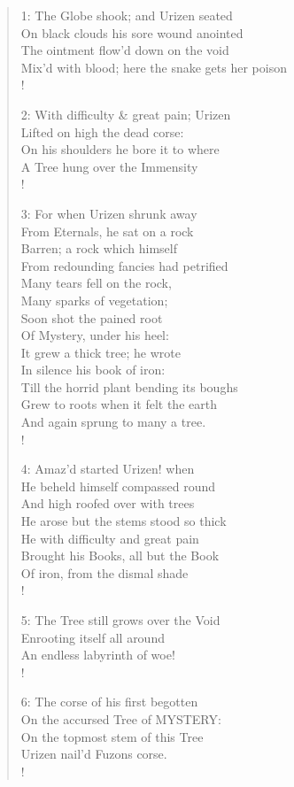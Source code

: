 \documentclass[9pt]{extarticle}
\begin{document}
\begin{verse}
\begin{altverse} 
		
		1: The Globe shook; and Urizen seated\\
		On black clouds his sore wound anointed\\
		The ointment flow’d down on the void\\
		Mix’d with blood; here the snake gets her poison\\!
		
		2: With difficulty \& great pain; Urizen\\
		Lifted on high the dead corse:\\
		On his shoulders he bore it to where\\
		A Tree hung over the Immensity\\!
		
		3: For when Urizen shrunk away\\
		From Eternals, he sat on a rock\\
		Barren; a rock which himself\\
		From redounding fancies had petrified\\
		Many tears fell on the rock,\\
		Many sparks of vegetation;\\
		Soon shot the pained root\\
		Of Mystery, under his heel:\\
		It grew a thick tree; he wrote\\
		In silence his book of iron:\\
		Till the horrid plant bending its boughs\\
		Grew to roots when it felt the earth\\
		And again sprung to many a tree.\\!
		
		4: Amaz’d started Urizen! when\\
		He beheld himself compassed round\\
		And high roofed over with trees\\
		He arose but the stems stood so thick\\
		He with difficulty and great pain\\
		Brought his Books, all but the Book\\
		Of iron, from the dismal shade\\!
		
		5: The Tree still grows over the Void\\
		Enrooting itself all around\\
		An endless labyrinth of woe!\\!
		
		6: The corse of his first begotten\\
		On the accursed Tree of MYSTERY:\\
		On the topmost stem of this Tree\\
		Urizen nail’d Fuzons corse.\\!
		
\end{altverse}
\end{verse}	
\end{document}
